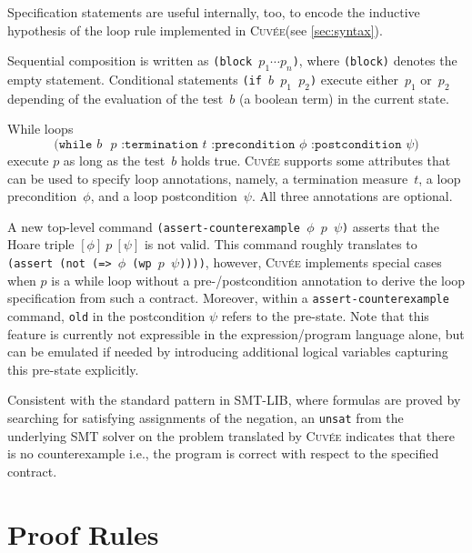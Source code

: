 \documentclass[fleqn]{llncs}
\newcommand{\Cuvee}{\textsc{Cuvée}\xspace}
\newcommand{\code}[1]{\texttt{#1}}
\newcommand{\hoaretotal}[3]{[ #1 ]~#2~[ #3 ]}
\begin{document}
Specification statements are useful internally, too, to encode the inductive hypothesis of the loop rule implemented in \Cuvee (see \cref{sec:syntax}).

Sequential composition is written as \code{(block $p_1 \cdots p_n$)}, where \code{(block)} denotes the empty statement.
Conditional statements \code{(if $b$ $p_1$ $p_2$)} execute either~$p_1$ or~$p_2$ depending of the evaluation of the test~$b$ (a boolean term) in the current state.

\medskip
\noindent
While loops
\[ \code{(while $b$ $p$ :termination $t$ :precondition $\phi$ :postcondition $\psi$)} \]
execute $p$ as long as the test~$b$ holds true.
\Cuvee supports some attributes that can be used to specify loop annotations,
namely, a termination measure~$t$, a loop precondition~$\phi$, and a loop postcondition~$\psi$.
All three annotations are optional.

\medskip

A new top-level command \code{(assert-counterexample $\phi$ $p$ $\psi$)}
asserts that the Hoare triple $\hoaretotal{\phi}{p}{\psi}$ is not valid.
This command roughly translates to \code{(assert (not (=> $\phi$ (wp $p$ $\psi$))))},
however, \Cuvee implements special cases when $p$ is a while loop without a pre-/postcondition annotation
to derive the loop specification from such a contract.
Moreover, within a \code{assert-counterexample} command,
\code{old} in the postcondition $\psi$ refers to the pre-state.
Note that this feature is currently not expressible in the expression/program language alone,
but can be emulated if needed by introducing additional logical variables capturing this pre-state explicitly.

Consistent with the standard pattern in SMT-LIB, where formulas are proved by searching for satisfying assignments of the negation,
an \code{unsat} from the underlying SMT solver on the problem translated by \Cuvee indicates that there is no counterexample
i.e., the program is correct with respect to the specified contract.

\section{Proof Rules}
\label{sec:semantics}
\end{document}
